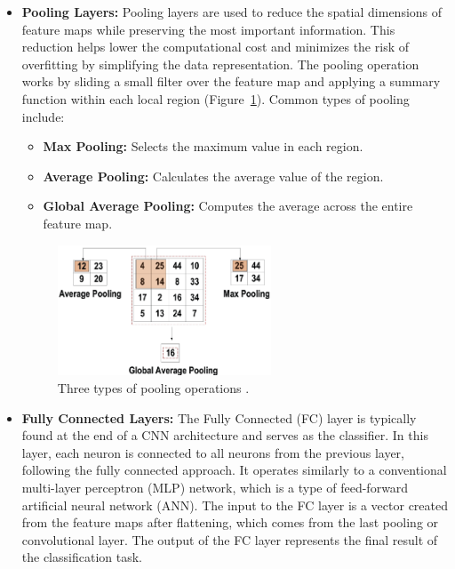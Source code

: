 \begin{itemize}
    \item \textbf{Pooling Layers:} Pooling layers are used to reduce the spatial dimensions of feature maps while preserving the most important information. This reduction helps lower the computational cost and minimizes the risk of overfitting by simplifying the data representation. The pooling operation works by sliding a small filter over the feature map and applying a summary function within each local region (Figure~\ref{fig:figure06}). Common types of pooling include:
    \begin{itemize}
        \item \textbf{Max Pooling:} Selects the maximum value in each region.
        \item \textbf{Average Pooling:} Calculates the average value of the region.
        \item \textbf{Global Average Pooling:} Computes the average across the entire feature map.
     \end{itemize}  
    
     \begin{figure}[H] %
        \centering
        \includegraphics[width=0.6\textwidth]{chapters/chapter1/images/Figure06.png}
        \caption{Three types of pooling operations \parencite{alzubaidi2021review}.}
        \label{fig:figure06}
    \end{figure}
 
    \item \textbf{Fully Connected Layers:} The Fully Connected (FC) layer is typically found at the end of a CNN architecture and serves as the classifier. In this layer, each neuron is connected to all neurons from the previous layer, following the fully connected approach. It operates similarly to a conventional multi-layer perceptron (MLP) network, which is a type of feed-forward artificial neural network (ANN). The input to the FC layer is a vector created from the feature maps after flattening, which comes from the last pooling or convolutional layer. The output of the FC layer represents the final result of the classification task.
    
\end{itemize}

